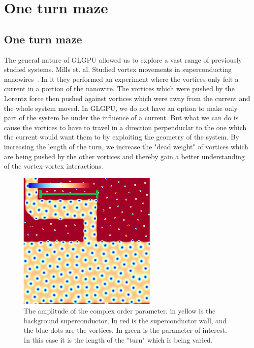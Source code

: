 \chapter{One turn maze}

\section{One turn maze}
The general nature of GLGPU allowed us to explore a vast range of previously studied systems. Mills et. al. Studied vortex movements in superconducting nanowires~\cite{Mills16}. In it they performed an experiment where the vortices only felt a current in a portion of the nanowire. The vortices which were pushed by the Lorentz force then pushed against vortices which were away from the current and the whole system moved. In GLGPU, we do not have an option to make only part of the system be under the influence of a current. But what we can do is cause the vortices to have to travel in a direction perpenduclar to the one which the current would want them to by exploiting the geometry of the system. By increasing the length of the turn, we increase the "dead weight" of vortices which are being pushed by the other vortices and thereby gain a better understanding of the vortex-vortex interactions.   

\begin{figure}[htbp]
\begin{center}
\includegraphics[scale=.50]{oneKinkDone.png}
\caption{ The amplitude of the complex order parameter. in yellow is the background superconductor, In red is the superconductor wall, and the blue dots are the vortices. In green is the parameter of interest. In this case it is the length of the "turn" which is being varied.}
\label{oneSidedY}
\end{center}
\end{figure}

